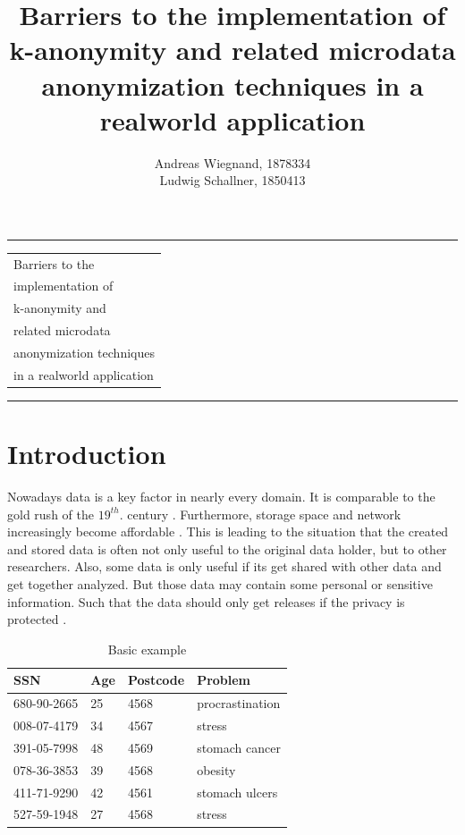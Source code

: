 \documentclass{llncs}
\begin{document}
\thispagestyle{empty}
\rule{\textwidth}{1pt}
\vspace{2pt}
\begin{flushright}
\Huge
\begin{tabular}{@{}l}
Barriers to the\\
implementation of\\
k-anonymity and\\
related microdata\\
anonymization techniques\\
in a realworld application\\[6pt]

\end{tabular}
\end{flushright}
\rule{\textwidth}{1pt}
\vfill
\title{Barriers to the implementation of k-anonymity and related microdata anonymization techniques in a realworld application}
\author{Andreas Wiegnand, 1878334\\
	Ludwig Schallner, 1850413}
\institute{}
\maketitle
%
\newpage
\setcounter{page}{1}
\section{Introduction}
%
Nowadays data is a key factor in nearly every domain. It is comparable to the gold rush of the \ensuremath{19^{th}.} century \cite{datarevo}. Furthermore, storage space and network increasingly become affordable \cite{sweeney2002k}. 
This is leading to the situation that the created and stored data is often not only useful to the original data holder, but to other researchers. Also, some data is only useful if its get shared with other data and get together analyzed. But those data may contain some personal or sensitive information. Such that the data should only get releases if the privacy is protected \cite{li2006achieving}.\\
\begin{table}[]
	\centering
	\caption{Basic example}
	\label{intro_example}
	\begin{tabular}{@{}llll@{}}
		\toprule
		SSN         & Age & Postcode & Problem         \\ \midrule
		680-90-2665 & 25  & 4568     & procrastination \\
		008-07-4179 & 34  & 4567     & stress          \\
		391-05-7998 & 48  & 4569     & stomach cancer  \\
		078-36-3853 & 39  & 4568     & obesity         \\
		411-71-9290 & 42  & 4561     & stomach ulcers  \\
		527-59-1948 & 27  & 4568     & stress          \\ \bottomrule
	\end{tabular}
\end{table}
\end{document}
